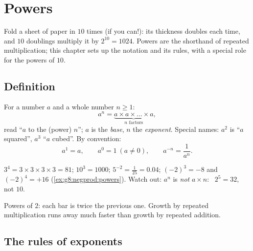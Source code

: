 \chapter{Powers}\label{ch:g8:powers}

Fold a sheet of paper in  $10$ times (if you can!): its thickness
doubles each time, and $10$ doublings multiply it by
$2^{10} = 1024$. Powers are the shorthand of repeated multiplication;
this chapter sets up the notation and its rules, with a special role
for the powers of $10$.

\section{Definition}

\begin{definition}[Power]\label{def:g8:powers:def}
For a number $a$ and a whole number $n \geq 1$:
\[
a^n = \underbrace{a \times a \times \dots \times a}_{n
\text{ factors}},
\]
read ``$a$ to the (power) $n$''; $a$ is the \emph{base}, $n$ the
\emph{exponent}. Special names: $a^2$ is ``$a$
squared'', $a^3$ ``$a$ cubed''. By convention:
\[
a^1 = a,
\qquad
a^0 = 1 \ (a \neq 0),
\qquad
a^{-n} = \frac{1}{a^n}.
\]
\end{definition}

\begin{example}\label{ex:g8:powers:def}
$3^4 = 3 \times 3 \times 3 \times 3 = 81$; \quad
$10^3 = 1000$; \quad $5^{-2} = \frac{1}{25} = 0.04$; \quad
$(-2)^3 = -8$ and $(-2)^4 = +16$
(\cref{ex:g8:negprod:powers}). Watch out: $a^n$ is \emph{not}
$a \times n$: \ $2^5 = 32$, not $10$.
\end{example}

\begin{omfigure}

{\small Powers of $2$: each bar is twice the previous one. Growth by
repeated multiplication runs away much faster than growth by repeated
addition.}
\end{omfigure}

\section{The rules of exponents}

